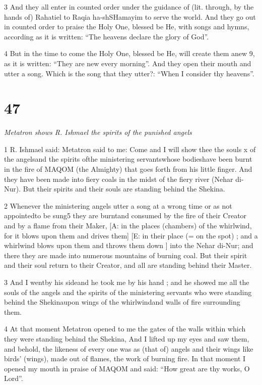 \par 3 And they all enter in counted order under the guidance of (lit. through, by the hands of) Rahatiel to Raqia ha-shSHamayim to serve the world. And they go out in counted order to praise the Holy One, blessed be He, with songs and hymns, according as it is written: “The heavens declare the glory of God”. 

\par 4 But in the time to come the Holy One, blessed be He, will create them anew 9, as it is written: “They are new every morning”. And they open their mouth and utter a song. Which is the song that they utter?: “When I consider thy heavens”. 

\chapter{47}

\par \textit{Metatron shows R. Ishmael the spirits of the punished angels}

\par 1 R. Ishmael said: Metatron said to me: Come and I will show thee the souls x of the angelsand the spirits ofthe ministering servantswhose bodieshave been burnt in the fire of MAQOM (the Almighty) that goes forth from his little finger. And they have been made into fiery coals in the midst of the fiery river (Nehar di-Nur). But their spirits and their souls are standing behind the Shekina. 

\par 2 Whenever the ministering angels utter a song at a wrong time or as not appointedto be sung5 they are burntand consumed by the fire of their Creator and by a flame from their Maker, [A: in the places (chambers) of the whirlwind, for it blows upon them and drives them] [E: in their place (= on the spot) ; and  a whirlwind blows upon them and  throws them down  ] into the Nehar di-Nur; and there they are made into numerous mountains of burning coal. But their spirit and their soul return to their Creator, and all are standing behind their Master. 

\par 3 And I wentby his sideand he took me by his hand ; and he showed me all the souls of the angels and the spirits of the ministering servants who were standing behind the Shekinaupon wings of the whirlwindand walls of fire surrounding them. 

\par 4 At that moment Metatron opened to me the gates of the walls within which they were standing behind the Shekina, And I lifted up my eyes and saw them, and behold, the likeness of every one was as (that of) angels and their wings like birds' (wings), made out of flames, the work of burning fire. In that moment I opened my mouth in praise of MAQOM and said: “How great are thy works, O Lord”. 

